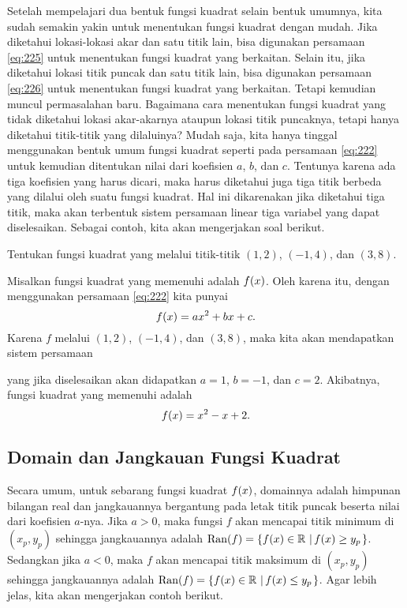 	\par Setelah mempelajari dua bentuk fungsi kuadrat selain bentuk umumnya, kita sudah semakin yakin untuk menentukan fungsi kuadrat dengan mudah. Jika diketahui lokasi-lokasi akar dan satu titik lain, bisa digunakan persamaan \ref{eq:225} untuk menentukan fungsi kuadrat yang berkaitan. Selain itu, jika diketahui lokasi titik puncak dan satu titik lain, bisa digunakan persamaan \ref{eq:226} untuk menentukan fungsi kuadrat yang berkaitan. Tetapi kemudian muncul permasalahan baru. Bagaimana cara menentukan fungsi kuadrat yang tidak diketahui lokasi akar-akarnya ataupun lokasi titik puncaknya, tetapi hanya diketahui titik-titik yang dilaluinya? Mudah saja, kita hanya tinggal menggunakan bentuk umum fungsi kuadrat seperti pada persamaan \ref{eq:222} untuk kemudian ditentukan nilai dari koefisien $ a $, $ b $, dan $ c $. Tentunya karena ada tiga koefisien yang harus dicari, maka harus diketahui juga tiga titik berbeda yang dilalui oleh suatu fungsi kuadrat. Hal ini dikarenakan jika diketahui tiga titik, maka akan terbentuk sistem persamaan linear tiga variabel yang dapat diselesaikan. Sebagai contoh, kita akan mengerjakan soal berikut.
	
	\begin{contoh}
		Tentukan fungsi kuadrat yang melalui titik-titik $ \left(1, 2\right) $, $ \left(-1, 4\right) $, dan $ \left(3, 8\right) $.
	\end{contoh}
	\begin{jawab}
		Misalkan fungsi kuadrat yang memenuhi adalah $ \mathop{}\!{f}{\left({x}\right)} $. Oleh karena itu, dengan menggunakan persamaan \ref{eq:222} kita punyai
		\[ \mathop{}\!{f}{\left({x}\right)} = ax^{2} + bx + c. \]
		Karena $ f $ melalui $ \left(1, 2\right) $, $ \left(-1, 4\right) $, dan $ \left(3, 8\right) $, maka kita akan mendapatkan sistem persamaan
		\begin{center}
		\end{center}
		yang jika diselesaikan akan didapatkan $ a = 1 $, $ b = -1 $, dan $ c = 2 $. Akibatnya, fungsi kuadrat yang memenuhi adalah
		\[ \mathop{}\!{f}{\left({x}\right)} = x^{2} - x + 2. \]
	\end{jawab}
	
\subsection{Domain dan Jangkauan Fungsi Kuadrat}
	
	Secara umum, untuk sebarang fungsi kuadrat $ \mathop{}\!{f}{\left({x}\right)} $, domainnya adalah himpunan bilangan real dan jangkauannya bergantung pada letak titik puncak beserta nilai dari koefisien $ a $-nya. Jika $ a > 0 $, maka fungsi $ f $ akan mencapai titik minimum di $ \left(x_{p}, y_{p}\right) $ sehingga jangkauannya adalah $ \mathop{}\!{\operatorname{Ran}}{\left({f}\right)} = \mathop{}\!\left\lbrace{{\mathop{}\!{f}{\left({x}\right)} \in \mathbb{R}} \, \left|\, {\mathop{}\!{f}{\left({x}\right)} \geq y_{p}}\right.}\right\rbrace $. Sedangkan jika $ a < 0 $, maka $ f $ akan mencapai titik maksimum di $ \left(x_{p}, y_{p}\right) $ sehingga jangkauannya adalah $ \mathop{}\!{\operatorname{Ran}}{\left({f}\right)} = \mathop{}\!\left\lbrace{{\mathop{}\!{f}{\left({x}\right)} \in \mathbb{R}} \, \left|\, {\mathop{}\!{f}{\left({x}\right)} \leq y_{p}}\right.}\right\rbrace $. Agar lebih jelas, kita akan mengerjakan contoh berikut.
	
